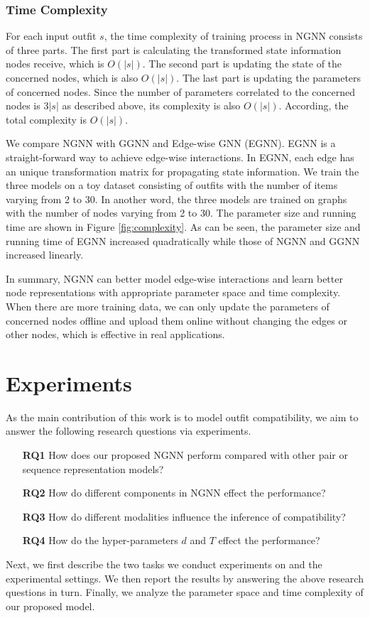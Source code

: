 \documentclass[sigconf]{acmart}
\begin{document}
\subsubsection{Time Complexity}
For each input outfit $s$, the time complexity of training process in NGNN consists of three parts. The first part is calculating the transformed state information nodes receive, which is $O(\left | s \right |)$. The second part is updating the state of the concerned nodes, which is also $O(\left | s \right |)$.
The last part is updating the parameters of concerned nodes. Since the number of parameters correlated to the concerned nodes is $3\left | s \right|$ as described above, its complexity is also $O(\left | s \right |)$. According, the total complexity is $O(\left | s \right |)$.

We compare NGNN with GGNN \cite{li2015gated} and Edge-wise GNN (EGNN). EGNN is a straight-forward way to achieve edge-wise interactions. In EGNN, each edge has an unique transformation matrix for propagating state information. We train the three models on a toy dataset consisting of outfits with the number of items varying from 2 to 30. In another word, the three models are trained on graphs with the number of nodes varying from 2 to 30.
The parameter size and running time are shown in Figure \ref{fig:complexity}.
As can be seen, the parameter size and running time of EGNN increased quadratically while those of NGNN and GGNN increased linearly.


In summary, NGNN can better model edge-wise interactions and learn better node representations with appropriate parameter space and time complexity. When there are more training data, we can only update the parameters of concerned nodes offline and upload them online without changing the edges or other nodes, which is effective in real applications.




\section{Experiments}
As the main contribution of this work is to model outfit compatibility, we aim to answer the following research questions via experiments.
\begin{itemize}
\item[\textbf{RQ1}]
 How does our proposed NGNN perform compared with other pair or sequence representation models?
\item[\textbf{RQ2}]
 How do different components in NGNN effect the performance?
\item[\textbf{RQ3}]
 How do different modalities influence the inference of compatibility?
\item[\textbf{RQ4}]
 How do the hyper-parameters $d$ and $T$ effect the performance?
\end{itemize}
 Next, we first describe the two tasks we conduct experiments on and the experimental settings. We then report the results by answering the above research questions in turn.
 Finally, we analyze the parameter space and time complexity of our proposed model.
\end{document}
